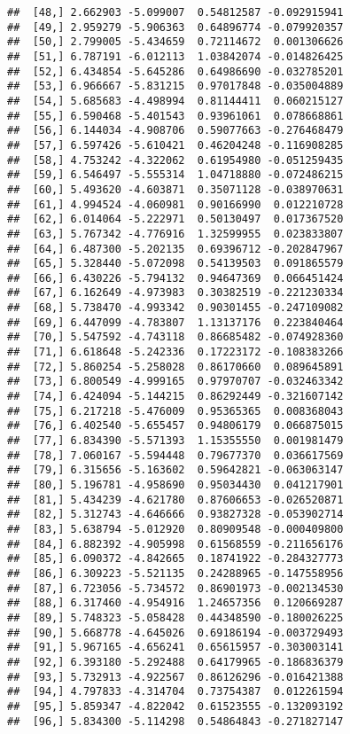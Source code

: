 \documentclass[
]{article}
\begin{document}
\begin{verbatim}
##  [48,] 2.662903 -5.099007  0.54812587 -0.092915941
##  [49,] 2.959279 -5.906363  0.64896774 -0.079920357
##  [50,] 2.799005 -5.434659  0.72114672  0.001306626
##  [51,] 6.787191 -6.012113  1.03842074 -0.014826425
##  [52,] 6.434854 -5.645286  0.64986690 -0.032785201
##  [53,] 6.966667 -5.831215  0.97017848 -0.035004889
##  [54,] 5.685683 -4.498994  0.81144411  0.060215127
##  [55,] 6.590468 -5.401543  0.93961061  0.078668861
##  [56,] 6.144034 -4.908706  0.59077663 -0.276468479
##  [57,] 6.597426 -5.610421  0.46204248 -0.116908285
##  [58,] 4.753242 -4.322062  0.61954980 -0.051259435
##  [59,] 6.546497 -5.555314  1.04718880 -0.072486215
##  [60,] 5.493620 -4.603871  0.35071128 -0.038970631
##  [61,] 4.994524 -4.060981  0.90166990  0.012210728
##  [62,] 6.014064 -5.222971  0.50130497  0.017367520
##  [63,] 5.767342 -4.776916  1.32599955  0.023833807
##  [64,] 6.487300 -5.202135  0.69396712 -0.202847967
##  [65,] 5.328440 -5.072098  0.54139503  0.091865579
##  [66,] 6.430226 -5.794132  0.94647369  0.066451424
##  [67,] 6.162649 -4.973983  0.30382519 -0.221230334
##  [68,] 5.738470 -4.993342  0.90301455 -0.247109082
##  [69,] 6.447099 -4.783807  1.13137176  0.223840464
##  [70,] 5.547592 -4.743118  0.86685482 -0.074928360
##  [71,] 6.618648 -5.242336  0.17223172 -0.108383266
##  [72,] 5.860254 -5.258028  0.86170660  0.089645891
##  [73,] 6.800549 -4.999165  0.97970707 -0.032463342
##  [74,] 6.424094 -5.144215  0.86292449 -0.321607142
##  [75,] 6.217218 -5.476009  0.95365365  0.008368043
##  [76,] 6.402540 -5.655457  0.94806179  0.066875015
##  [77,] 6.834390 -5.571393  1.15355550  0.001981479
##  [78,] 7.060167 -5.594448  0.79677370  0.036617569
##  [79,] 6.315656 -5.163602  0.59642821 -0.063063147
##  [80,] 5.196781 -4.958690  0.95034430  0.041217901
##  [81,] 5.434239 -4.621780  0.87606653 -0.026520871
##  [82,] 5.312743 -4.646666  0.93827328 -0.053902714
##  [83,] 5.638794 -5.012920  0.80909548 -0.000409800
##  [84,] 6.882392 -4.905998  0.61568559 -0.211656176
##  [85,] 6.090372 -4.842665  0.18741922 -0.284327773
##  [86,] 6.309223 -5.521135  0.24288965 -0.147558956
##  [87,] 6.723056 -5.734572  0.86901973 -0.002134530
##  [88,] 6.317460 -4.954916  1.24657356  0.120669287
##  [89,] 5.748323 -5.058428  0.44348590 -0.180026225
##  [90,] 5.668778 -4.645026  0.69186194 -0.003729493
##  [91,] 5.967165 -4.656241  0.65615957 -0.303003141
##  [92,] 6.393180 -5.292488  0.64179965 -0.186836379
##  [93,] 5.732913 -4.922567  0.86126296 -0.016421388
##  [94,] 4.797833 -4.314704  0.73754387  0.012261594
##  [95,] 5.859347 -4.822042  0.61523555 -0.132093192
##  [96,] 5.834300 -5.114298  0.54864843 -0.271827147

\end{verbatim}
\end{document}
